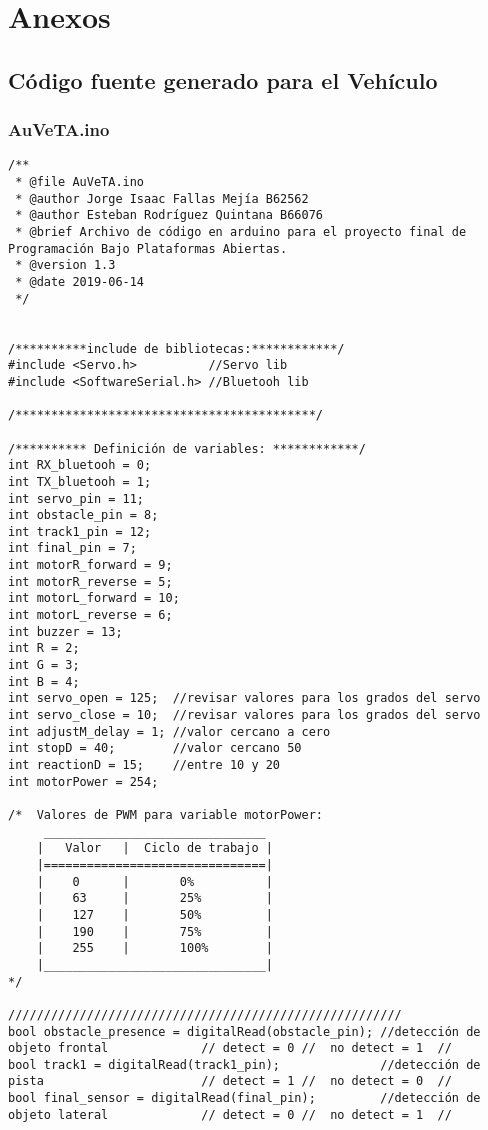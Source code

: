 \newpage
\section{Anexos}

\subsection{Código fuente generado para el Vehículo}
\subsubsection{AuVeTA.ino}
\begin{lstlisting}
/**
 * @file AuVeTA.ino
 * @author Jorge Isaac Fallas Mejía B62562
 * @author Esteban Rodríguez Quintana B66076
 * @brief Archivo de código en arduino para el proyecto final de Programación Bajo Plataformas Abiertas.
 * @version 1.3
 * @date 2019-06-14
 */


/**********include de bibliotecas:************/
#include <Servo.h>          //Servo lib
#include <SoftwareSerial.h> //Bluetooh lib

/******************************************/

/********** Definición de variables: ************/
int RX_bluetooh = 0;
int TX_bluetooh = 1;
int servo_pin = 11;
int obstacle_pin = 8;
int track1_pin = 12;
int final_pin = 7;
int motorR_forward = 9;
int motorR_reverse = 5;
int motorL_forward = 10;
int motorL_reverse = 6;
int buzzer = 13;
int R = 2;
int G = 3;
int B = 4;
int servo_open = 125;  //revisar valores para los grados del servo
int servo_close = 10;  //revisar valores para los grados del servo
int adjustM_delay = 1; //valor cercano a cero
int stopD = 40;        //valor cercano 50
int reactionD = 15;    //entre 10 y 20
int motorPower = 254;

/*  Valores de PWM para variable motorPower:
     _______________________________
    |   Valor   |  Ciclo de trabajo |
    |===============================|
    |    0      |       0%          |
    |    63     |       25%         |
    |    127    |       50%         |
    |    190    |       75%         |
    |    255    |       100%        |
    |_______________________________|
*/

///////////////////////////////////////////////////////
bool obstacle_presence = digitalRead(obstacle_pin); //detección de objeto frontal             // detect = 0 //  no detect = 1  //
bool track1 = digitalRead(track1_pin);              //detección de pista                      // detect = 1 //  no detect = 0  //
bool final_sensor = digitalRead(final_pin);         //detección de objeto lateral             // detect = 0 //  no detect = 1  //



\end{lstlisting}
